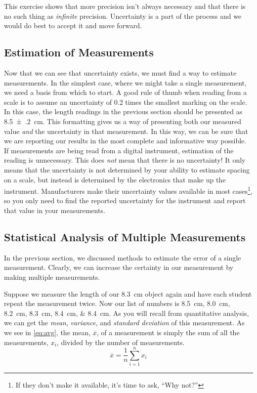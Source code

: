 \documentclass[nobib,nofonts,nols,nohyper]{tufte-handout}
\begin{document}
This exercise shows that more precision isn't always necessary and that there is no such thing as \emph{infinite} precision. 
Uncertainty is a part of the process and we would do best to accept it and move forward. 


\subsection{Estimation of Measurements} %
\label{sub:estimation_of_measurements}

Now that we can see that uncertainty exists, we must find a way to estimate measurements. 
In the simplest case, where we might take a single measurement, we need a basis from which to start. 
A good rule of thumb when reading from a scale is to assume an uncertainty of \num{0.2} times the smallest marking on the scale. 
In this case, the length readings in the previous section should be presented as \qty{8.5(2)}{\cm}. 
This formatting gives us a way of presenting both our measured value \emph{and} the uncertainty in that measurement. 
In this way, we can be sure that we are reporting our results in the most complete and informative way possible. 
If measurements are being read from a digital instrument, estimation of the reading is unnecessary. 
This does \emph{not} mean that there is no uncertainty! 
It only means that the uncertainty is not determined by your ability to estimate spacing on a scale, but instead is determined by the electronics that make up the instrument. 
Manufacturers make their uncertainty values available in most cases\footnote{If they don't make it available, it's time to ask, ``Why not?''}, so you only need to find the reported uncertainty for the instrument and report that value in your measurements. 


\subsection{Statistical Analysis of Multiple Measurements} %
\label{sub:statistical_analysis_of_multiple_measurements}

In the previous section, we discussed methods to estimate the error of a single measurement. 
Clearly, we can increase the certainty in our measurement by making multiple measurements. 

Suppose we measure the length of our \qty{8.3}{\cm} object again and have each student repeat the measurement twice. 
Now our list of numbers is \SIlist{8.5;8.0;8.2;8.3;8.4;8.4}{\cm}. 
As you will recall from quantitative analysis, we can get the \emph{mean}, \emph{variance}, and \emph{standard deviation} of this measurement. 
As we see in \cref{eq:avg}, the mean, \( \overline{x} \), of a measurement is simply the sum of all the measurements, \( x_i \), divided by the number of measurements.
\begin{equation}
	\overline{x} = \frac{1}{n}\sum_{i=1}^n{x_i}
	\label{eq:avg}
\end{equation}
\end{document}
